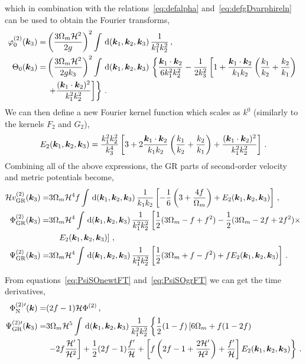 which in combination with the relations~\eqref{eq:defalpha} and~\eqref{eq:defgDvarphireln} can be used to obtain the Fourier transforms, 
\begin{align}
	\varphi^{(2)}_0 (\bm {k}_3) =& \left( \frac{3 \Omega_m \mathcal{H}^2 }{2 g} \right)^2 \int\,\mathrm{d}(\bm {k}_1,\bm {k}_2,\bm {k}_3)\, \frac{1}{k_1^2 k_2^2}\,,\\
	\Theta_0(\bm {k}_3) =& \left( \frac{3 \Omega_m \mathcal{H}^2}{2 g k_3} \right)^2 \int \,\mathrm{d}(\bm {k}_1,\bm {k}_2,\bm {k}_3)\,\left\{ \frac{\bm {k}_1 \cdot \bm {k}_2}{6 k_1^2 k_2^2} - \frac{1}{2 k_3^2} \left[ 1 + \frac{\bm {k}_1 \cdot \bm {k}_2}{k_1 k_2} \left( \frac{k_1}{k_2} + \frac{k_2}{k_1} \right) \right. \right. \nonumber \\
	&\left. \left. + \frac{(\bm {k}_1 \cdot \bm {k}_2)^2}{k_1^2 k_2^2} \right] \right\}\,.
\end{align}
We can then define a new Fourier kernel function which scales as $k^0$ (similarly to the kernels $F_2$ and $G_2$), 
\begin{equation}
	E_2(\bm {k}_1,\bm {k}_2,\bm {k}_3) = \frac{k_1^2 k_2^2}{k_3^4} \left[ 3 + 2\frac{\bm {k}_1\cdot\bm {k}_2}{k_1 k_2} \left( \frac{k_1}{k_2} + \frac{k_2}{k_1} \right) + \frac{(\bm {k}_1 \cdot \bm {k}_2)^2}{k_1^2 k_2^2} \right]\,.
\end{equation}
Combining all of the above expressions, the GR parts of second-order velocity and metric potentials become, 
\begin{align}
	\mathcal{H} v^{(2)}_{\mathrm{GR}}(\bm {k}_3) =& 3 \Omega_m \mathcal{H}^4 f \int \,\mathrm{d}(\bm {k}_1,\bm {k}_2,\bm {k}_3)\, \frac{1}{k_1 k_2} \left[ - \frac{1}{6} \left( 3 + \frac{4 f}{\Omega_m} \right) + E_2(\bm {k}_1,\bm {k}_2,\bm {k}_3) \right]\,,\\
	\Phi_{\mathrm{GR}}^{(2)}(\bm {k}_3) =& 3 \Omega_m \mathcal{H}^4 \int \,\mathrm{d}(\bm {k}_1,\bm {k}_2,\bm {k}_3)\, \frac{1}{k_1^2 k_2^2} \left[ \frac{1}{2} (3 \Omega_m - f + f^2)  - \frac{1}{2}(3 \Omega_m - 2f + 2 f^2)\times\right.\nonumber\\
	&\left. \quad E_2(\bm {k}_1,\bm {k}_2,\bm {k}_3) \right]\,,\\
	\Psi_{\mathrm{GR}}^{(2)}(\bm {k}_3) =& 3 \Omega_m \mathcal{H}^4 \int \,\mathrm{d}(\bm {k}_1,\bm {k}_2,\bm {k}_3)\, \frac{1}{k_1^2 k_2^2} \left[ \frac{1}{2} (3 \Omega_m + f - f^2) + f E_2(\bm {k}_1,\bm {k}_2,\bm {k}_3) \right]\,.\label{eq:PsiSOgrFT}
\end{align}

From equations~\eqref{eq:PsiSOnewtFT} and~\eqref{eq:PsiSOgrFT} we can get the time derivatives, 
\begin{align}
	\Phi_{\mathrm{N}}^{{(2)}\prime}(\bm {k}) =& (2 f - 1) \mathcal{H} \Phi^{(2)}\,,\\
	\Psi_{\mathrm{GR}}^{{(2)}\prime}(\bm {k}_3) =& 3 \Omega_m \mathcal{H}^5 \int \,\mathrm{d}(\bm {k}_1,\bm {k}_2,\bm {k}_3)\, \frac{1}{k_1^2 k_2^2} \left\{ \frac{1}{2}(1-f) \left[ 6 \Omega_m + f(1-2f) \right. \right. \nonumber \\
	&\left. \left. -2f \frac{\mathcal{H}'}{\mathcal{H}^2} \right] + \frac{1}{2}(2f-1) \frac{f'}{\mathcal{H}} + \left[ f \left( 2f - 1 + \frac{2\mathcal{H}'}{\mathcal{H}^2} \right) + \frac{f'}{\mathcal{H}} \right] E_2(\bm {k}_1,\bm {k}_2,\bm {k}_3) \right\}\,.
\end{align}

